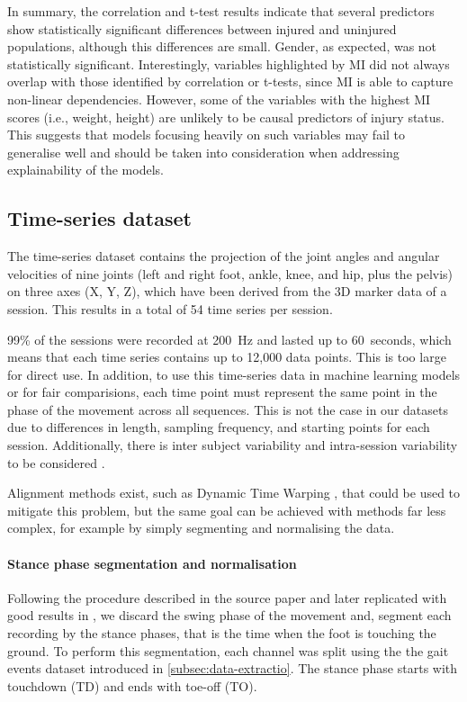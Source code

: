 In summary, the correlation and t-test results indicate that several predictors show statistically significant differences between injured and uninjured populations, although this differences are small. Gender, as expected, was not statistically significant. Interestingly, variables highlighted by MI did not always overlap with those identified by correlation or t-tests, since MI is able to capture non-linear dependencies. However, some of the variables with the highest MI scores (i.e., weight, height) are unlikely to be causal predictors of injury status. This suggests that models focusing heavily on such variables may fail to generalise well and should be taken into consideration when addressing explainability of the models.




\subsection{Time-series dataset}\label{subsec:method-ts-dataset}
The time-series dataset contains the projection of the joint angles and angular velocities of nine joints (left and right foot, ankle, knee, and hip, plus the pelvis) on three axes (X, Y, Z), which have been derived from the 3D marker data of a session. This results in a total of 54 time series per session.

99\% of the sessions were recorded at 200~Hz and lasted up to 60~seconds, which means that each time series contains up to 12,000 data points. This is too large for direct use. In addition, to use this time-series data in machine learning models or for fair comparisions, each time point must represent the same point in the phase of the movement across all sequences. This is not the case in our datasets due to differences in length, sampling frequency, and starting points for each session. Additionally, there is inter subject variability and intra-session variability to be considered \citep{Chau2005}.

Alignment methods exist, such as Dynamic Time Warping \citep{Bringmann2023}, that could be used to mitigate this problem, but the same goal can be achieved with methods far less complex, for example by simply segmenting and normalising the data.

\paragraph{Stance phase segmentation and normalisation}
Following the procedure described in the source paper \citep{Ferber2024} and later replicated with good results in \citep{FuentesJimnez2025}, we discard the swing phase of the movement and, segment each recording by the stance phases, that is the time when the foot is touching the ground. To perform this segmentation, each \gls{channel} was split using the the gait events dataset introduced in \ref{subsec:data-extractio}. The stance phase starts with touchdown (TD) and ends with toe-off (TO).


